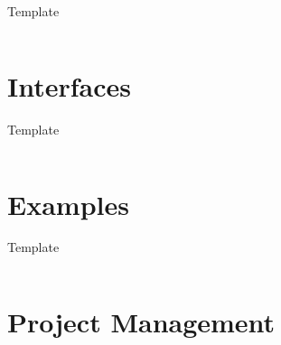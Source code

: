 \documentclass[9pt]{beamer}
\begin{document}
\begin{frame}{Template}
    \begin{columns}
        \begin{column}{0.5\textwidth}
            
        \end{column}
        \begin{column}{0.5\textwidth}
            
        \end{column}
    \end{columns}
\end{frame}

\section{Interfaces}

\begin{frame}{Template}
    \begin{columns}
        \begin{column}{0.5\textwidth}
            
        \end{column}
        \begin{column}{0.5\textwidth}
            
        \end{column}
    \end{columns}
\end{frame}

\section{Examples}

\begin{frame}{Template}
    \begin{columns}
        \begin{column}{0.5\textwidth}
            
        \end{column}
        \begin{column}{0.5\textwidth}
            
        \end{column}
    \end{columns}
\end{frame}

\section{Project Management}
\end{document}
